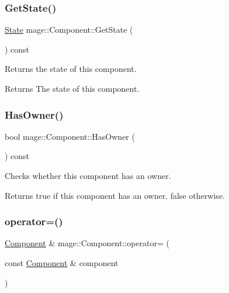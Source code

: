 \subsubsection{\texorpdfstring{Get\+State()}{GetState()}}
{\footnotesize\ttfamily \hyperlink{namespacemage_ae47d13d8477ee94893b9a3947d28eebc}{State} mage\+::\+Component\+::\+Get\+State (\begin{DoxyParamCaption}{ }\end{DoxyParamCaption}) const\hspace{0.3cm}{\ttfamily [noexcept]}}

Returns the state of this component.

\begin{DoxyReturn}{Returns}
The state of this component. 
\end{DoxyReturn}
\hypertarget{classmage_1_1_component_a8e62e223bdacc3eebddc43f8ebc8c4d9}{}\label{classmage_1_1_component_a8e62e223bdacc3eebddc43f8ebc8c4d9} 
\subsubsection{\texorpdfstring{Has\+Owner()}{HasOwner()}}
{\footnotesize\ttfamily bool mage\+::\+Component\+::\+Has\+Owner (\begin{DoxyParamCaption}{ }\end{DoxyParamCaption}) const\hspace{0.3cm}{\ttfamily [noexcept]}}

Checks whether this component has an owner.

\begin{DoxyReturn}{Returns}
{\ttfamily true} if this component has an owner. {\ttfamily false} otherwise. 
\end{DoxyReturn}
\hypertarget{classmage_1_1_component_a36f7fbb5f82fc7979d4e7d08389815ae}{}\label{classmage_1_1_component_a36f7fbb5f82fc7979d4e7d08389815ae} 
\subsubsection{\texorpdfstring{operator=()}{operator=()}\hspace{0.1cm}{\footnotesize\ttfamily [1/2]}}
{\footnotesize\ttfamily \hyperlink{classmage_1_1_component}{Component} \& mage\+::\+Component\+::operator= (\begin{DoxyParamCaption}\item[{const \hyperlink{classmage_1_1_component}{Component} \&}]{component }\end{DoxyParamCaption})\hspace{0.3cm}{\ttfamily [noexcept]}}

